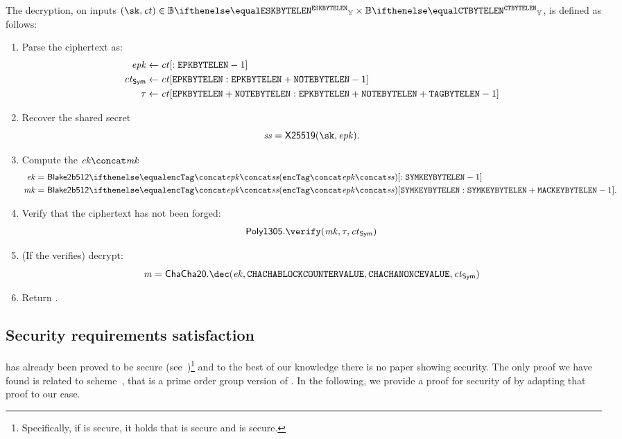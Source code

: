 The decryption, on inputs $(\sk, \ct) \in \BBy{\eskByteLen} \times \BBy{\ctByteLen}$, is defined as follows:
\begin{enumerate}
    \item Parse the ciphertext \ct{} as:
    \begin{align*}
        \mathit{epk} &\gets \mathit{ct}[: \mathtt{EPKBYTELEN}-1]\\
        \mathit{ct}_{\mathsf{Sym}} &\gets \mathit{ct}[\mathtt{EPKBYTELEN}: \mathtt{EPKBYTELEN} + \mathtt{NOTEBYTELEN}-1]\\
        \tau &\gets \mathit{ct}[\mathtt{EPKBYTELEN} + \mathtt{NOTEBYTELEN}: \mathtt{EPKBYTELEN} + \mathtt{NOTEBYTELEN} + \mathtt{TAGBYTELEN} -1]
    \end{align*}
    \item Recover the shared secret
    \[
        \sharedSecret = \xscalarmult{25519}(\sk, \epk).
    \]
    \item Compute the $\ek{}\concat\mk$
    \begin{align*}
        \ek &= \blake{2b512}{\encTag \concat \epk \concat\sharedSecret}[: \symKeyByteLen - 1]\\
        \mk &= \blake{2b512}{\encTag \concat \epk \concat\sharedSecret}[\symKeyByteLen: \symKeyByteLen + \macKeyByteLen - 1].
    \end{align*}
    \item Verify that the ciphertext has not been forged:
    \[
        \polymac{1305}.\verify(\mk, \tau, \ct_{\sym})
    \]
    \item (If the \mac{} verifies) decrypt:
    \[
        \msg = \chacha{20}.\dec(\ek, \chachaBlockCounterValue, \chachaNonceValue, \ct_{\sym})
    \]
    \item Return \msg.
\end{enumerate}

\subsection{Security requirements satisfaction}\label{instantiation:enc:security}

\dhaes{} has already been proved to be \indccaii{} secure (see~\cite[Section 3.5, Theorem 6]{abdalla1999dhaes})\footnote{Specifically, if \sym{} is \indcpa{} secure, it holds that \hash{} is \hdhi{} secure and \mac{} is \sufcma{} secure.} and to the best of our knowledge there is no paper showing \ikcca{} security. The only proof we have found is related to \dhies{} scheme~\cite{abdalla2010robust}, that is a prime order group version of \dhaes{}. In the following, we provide a proof for \ikcca{} security of \dhaes{} by adapting that proof to our case.


